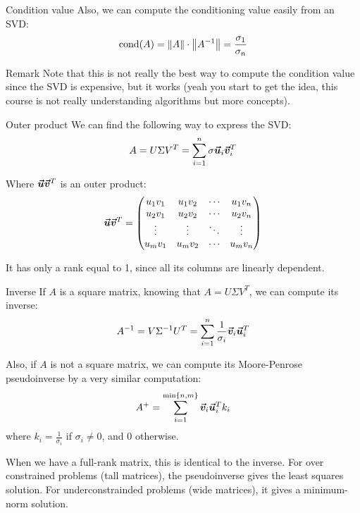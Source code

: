 \documentclass[a4paper]{article}
\begin{document}
\begin{parag}{Condition value}
    Also, we can compute the conditioning value easily from an SVD: 
    \[\cond\left(A\right) = \left\|A\right\| \cdot  \left\|A^{-1}\right\| = \frac{\sigma_1}{\sigma_n}\]
    
    \begin{subparag}{Remark}
        Note that this is not really the best way to compute the condition value since the SVD is expensive, but it works (yeah you start to get the idea, this course is not really understanding algorithms but more concepts).
    \end{subparag}
\end{parag}

\begin{parag}{Outer product}
    We can find the following way to express the SVD: 
    \[A = U \Sigma V^T = \sum_{i=1}^{n} \sigma \bm{\protect\vec{u}}_i \bm{\protect\vec{v}}_i^T\]
    
    Where $\bm{\protect\vec{u}} \bm{\protect\vec{v}}^T$ is an outer product: 
    \[\bm{\protect\vec{u}} \bm{\protect\vec{v}}^T = \begin{pmatrix} u_1 v_1 & u_1 v_2 & \cdots & u_1 v_n \\ u_2 v_1 & u_2 v_2 & \cdots & u_2 v_n \\ \vdots & \vdots & \ddots & \vdots \\ u_m v_1 & u_m v_2 & \cdots & u_m v_n \end{pmatrix} \]
    
    It has only a rank equal to 1, since all its columns are linearly dependent.
\end{parag}

\begin{parag}{Inverse}
    If $A$ is a square matrix, knowing that $A = U \Sigma V^T$, we can compute its inverse: 
    \[A^{-1} = V \Sigma^{-1} U^T = \sum_{i=1}^{n} \frac{1}{\sigma_i} \bm{\protect\vec{v}}_i \bm{\protect\vec{u}}_i^T\]

    Also, if $A$ is not a square matrix, we can compute its Moore-Penrose pseudoinverse by a very similar computation:
    \[A^+ = \sum_{i=1}^{\min\left\{n, m\right\}} \bvec{v}_i \bvec{u}_i^T k_i\]
    where $k_i = \frac{1}{\sigma_i}$ if $\sigma_i \neq 0$, and 0 otherwise.
    
    When we have a full-rank matrix, this is identical to the inverse. For over constrained problems (tall matrices), the pseudoinverse gives the least squares solution. For underconstrainded problems (wide matrices), it gives a minimum-norm solution.
\end{parag}
\end{document}
